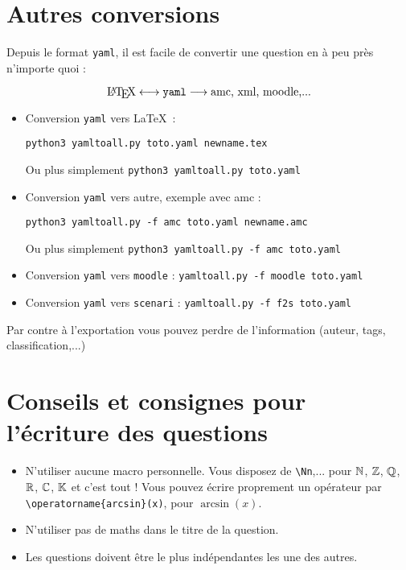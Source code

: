 \documentclass[12pt,a4paper]{article}
\begin{document}
\section{Autres conversions}
Depuis le format \texttt{yaml}, il est facile de convertir une question en à peu près n'importe quoi :

$$\text{\LaTeX} \longleftrightarrow \text{\texttt{yaml}} \longrightarrow \text{amc, xml, moodle,...}$$

\begin{itemize}
  
   \item Conversion \texttt{yaml} vers \LaTeX\ : \\
   \centerline{\texttt{python3 yamltoall.py toto.yaml newname.tex}} 
   
   Ou plus simplement \texttt{python3 yamltoall.py toto.yaml}
  
   \item Conversion \texttt{yaml} vers autre, exemple avec amc : \\
   \centerline{\texttt{python3 yamltoall.py -f amc toto.yaml newname.amc}} 
   Ou plus simplement \texttt{python3 yamltoall.py -f amc toto.yaml} 
   
    \item Conversion \texttt{yaml} vers \texttt{moodle} : 
    \texttt{yamltoall.py -f moodle toto.yaml}
    
    \item Conversion \texttt{yaml} vers \texttt{scenari} : 
    \texttt{yamltoall.py -f f2s toto.yaml}    
\end{itemize}

Par contre à l'exportation vous pouvez perdre de l'information (auteur, tags, classification,...)



\section{Conseils et consignes pour l'écriture des questions}

\begin{itemize}
  \item N'utiliser aucune macro personnelle. Vous disposez de \verb|\Nn|,... pour $\mathbb{N}$, $\mathbb{Z}$, $\mathbb{Q}$, $\mathbb{R}$, $\mathbb{C}$, $\mathbb{K}$ et c'est tout ! Vous pouvez écrire proprement un opérateur par \verb|\operatorname{arcsin}(x)|, pour $\operatorname{arcsin}(x)$.
  
  \item N'utiliser pas de maths dans le titre de la question.
  
  \item Les questions doivent être le plus indépendantes les une des autres.

  
\end{itemize}
\end{document}
